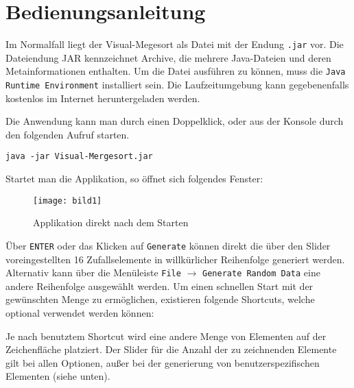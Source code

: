 \chapter{Bedienungsanleitung}\label{chap:bedienungsanleitung}

Im Normalfall liegt der Visual-Megesort als Datei mit der Endung \texttt{.jar} vor. Die Dateiendung JAR kennzeichnet Archive, die mehrere Java-Dateien und deren Metainformationen enthalten. Um die Datei ausführen zu können, muss die \texttt{Java Runtime Environment} installiert sein. Die Laufzeitumgebung kann gegebenenfalls kostenlos im Internet heruntergeladen werden.

Die Anwendung kann man durch einen Doppelklick, oder aus der Konsole durch den folgenden Aufruf starten.

\begin{verbatim}
java -jar Visual-Mergesort.jar
\end{verbatim}

Startet man die Applikation, so öffnet sich folgendes Fenster:

\begin{figure}[!htb]
    \centering
      \texttt{[image: bild1]}
    \caption{Applikation direkt nach dem Starten}
\end{figure}

Über \texttt{ENTER} oder das Klicken auf \texttt{Generate} können direkt die über den Slider voreingestellten 16 Zufallselemente in willkürlicher Reihenfolge generiert werden. Alternativ kann über die Menüleiste \texttt{File} $\rightarrow$ \texttt{Generate Random Data} eine andere Reihenfolge ausgewählt werden. Um einen schnellen Start mit der gewünschten Menge zu ermöglichen, existieren folgende Shortcuts, welche optional verwendet werden können:

Je nach benutztem Shortcut wird eine andere Menge von Elementen auf der Zeichenfläche platziert. Der Slider für die Anzahl der zu zeichnenden Elemente gilt bei allen Optionen, außer bei der generierung von benutzerspezifischen Elementen (siehe unten).

